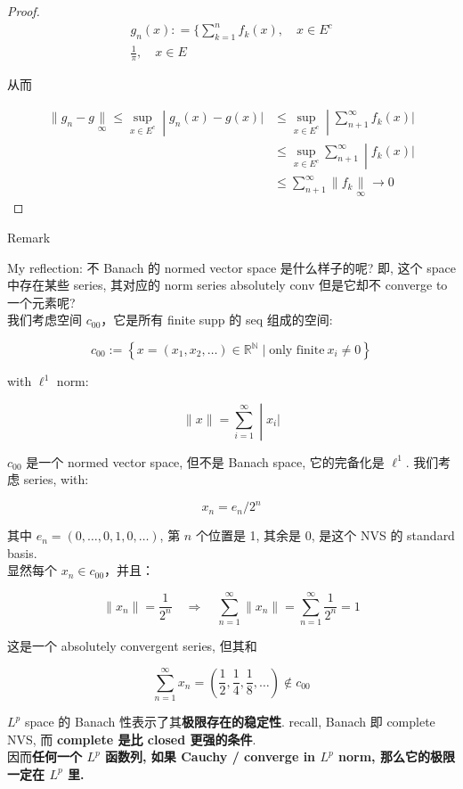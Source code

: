 \documentclass{qlnotes-export}
\begin{document}
\begin{proof}
\[\begin{matrix}
{g_{n}(x): = \{\sum\limits_{k = 1}^{n}f_{k}(x),\quad x \in E^{c}} \\
{\frac{1}{\pi},\quad x \in E}
\end{matrix}\]

从而

\[\begin{matrix}
\left. \parallel g_{n} - g\underset{\infty}{\parallel} \leq \sup\limits_{x \in E^{c}} \middle| g_{n}(x) - g(x)| \right. & \left. \leq \sup\limits_{x \in E^{c}} \middle| \sum\limits_{n + 1}^{\infty}f_{k}(x)| \right. \\
 & \left. \leq \sup\limits_{x \in E^{c}}\sum\limits_{n + 1}^{\infty} \middle| f_{k}(x)| \right. \\
 & {\leq \sum\limits_{n + 1}^{\infty} \parallel f_{k}\underset{\infty}{\parallel}\rightarrow 0}
\end{matrix}\]

\end{proof}

\begin{qlremark}{Remark}

My reflection: 不 Banach 的 normed vector space 是什么样子的呢? 即, 这个 space 中存在某些 series, 其对应的 norm series absolutely conv 但是它却不 converge to 一个元素呢?\\
我们考虑空间 \(c_{00}\)，它是所有 finite supp 的 seq 组成的空间:

\[c_{00} := \left\{ {x = (x_{1},x_{2},\ldots) \in {\mathbb{R}}^{\mathbb{N}} \mid \text{only finite}\ x_{i} \neq 0} \right\}\]

with \(\ell^{1}\) norm:

\[\left. \parallel x \parallel = \sum\limits_{i = 1}^{\infty} \middle| x_{i}| \right.\]

\(c_{00}\) 是一个 normed vector space, 但不是 Banach space, 它的完备化是 \(\ell^{1}\). 我们考虑 series, with:

\[x_{n} = e_{n}/2^{n}\]

其中 \(e_{n} = (0,\ldots,0,1,0,\ldots)\), 第 \(n\) 个位置是 1, 其余是 \(0\), 是这个 NVS 的 standard basis.\\
显然每个 \(x_{n} \in c_{00}\)，并且：

\[\parallel x_{n} \parallel = \frac{1}{2^{n}}\quad\Rightarrow\quad\sum\limits_{n = 1}^{\infty} \parallel x_{n} \parallel = \sum\limits_{n = 1}^{\infty}\frac{1}{2^{n}} = 1\]

这是一个 absolutely convergent series, 但其和

\[\sum\limits_{n = 1}^{\infty}x_{n} = \left( {\frac{1}{2},\frac{1}{4},\frac{1}{8},\ldots} \right) \notin c_{00}\]

\(L^{p}\) space 的 Banach 性表示了其\textbf{极限存在的稳定性}. recall, Banach 即 complete NVS, 而 \textbf{complete 是比 closed 更强的条件}.\\
因而\textbf{任何一个 \(L^{p}\) 函数列, 如果 Cauchy / converge in \(L^{p}\) norm, 那么它的极限一定在 \(L^{p}\) 里.}

\end{qlremark}
\end{document}
